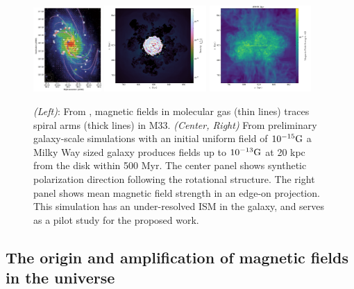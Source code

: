 \begin{figure}[t]
\begin{center}
\includegraphics[width=0.23\textwidth]{LiHenning.png}
\includegraphics[width=0.346\textwidth]{g30_g18d_annotate_7.png}
\includegraphics[width=0.346\textwidth]{g18d_0100_Projection_x_magnetic_field_strength_ones.png}
\end{center}
\vspace{-6mm}
\caption{\label{fig:SFR}
\emph{(Left)}: From \citet{2011Natur.479..499L}, magnetic fields in molecular
gas (thin lines) traces spiral arms (thick lines) in M33.
\emph{(Center, Right)} 
From preliminary galaxy-scale simulations with an initial
uniform field of $10^{-15}\rm{G}$ a Milky Way sized galaxy 
produces fields up to $10^{-13}\rm{G}$ at 20 kpc from the disk within 500 Myr.  
The center panel shows synthetic polarization direction following the rotational
structure.  The right panel shows mean magnetic field strength in an edge-on
projection.
This simulation has an
under-resolved ISM in the galaxy, and serves as a pilot study for the proposed
work. }
\vspace{-3mm}
\end{figure}

\vspace{-3mm}
\subsection{The origin and amplification of magnetic fields in the universe}
\label{sec:origins}
\vspace{-2mm}

